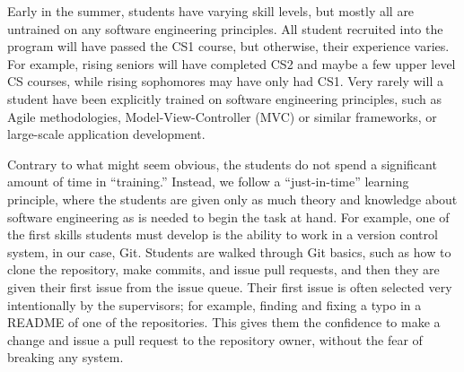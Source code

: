 Early in the summer, students have varying skill levels, but mostly all are untrained on any software engineering principles. All student recruited into the program will have passed the CS1 course, but otherwise, their experience varies. For example, rising seniors will have completed CS2 and maybe a few upper level CS courses, while rising sophomores may have only had CS1. Very rarely will a student have been explicitly trained on software engineering principles, such as Agile methodologies, Model-View-Controller (MVC) or similar frameworks, or large-scale application development.

Contrary to what might seem obvious, the students do not spend a significant amount of time in ``training.'' Instead, we follow a ``just-in-time'' learning principle, where the students are given only as much theory and knowledge about software engineering as is needed to begin the task at hand. For example, one of the first skills students must develop is the ability to work in a version control system, in our case, Git. Students are walked through Git basics, such as how to clone the repository, make commits, and issue pull requests, and then they are given their first issue from the issue queue. Their first issue is often selected very intentionally by the supervisors; for example, finding and fixing a typo in a README of one of the repositories. This gives them the confidence to make a change and issue a pull request to the repository owner, without the fear of breaking any system.


